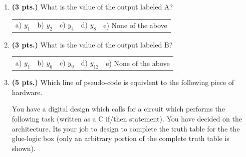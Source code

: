 \documentclass{article}
\begin{document}
\begin{enumerate}
\item {\bf (3 pts.)} What is the value of the output labeled A?

\begin{tabular}{p{0.6in} p{0.6in} p{0.6in} p{0.6in} l}
a) $y_{1}$ & b) $y_{2}$ & c) $y_{4}$ & d) $y_{8}$ & e) None of the above
\end{tabular}

\item {\bf (3 pts.)} What is the value of the output labeled B?

\begin{tabular}{p{0.6in} p{0.6in} p{0.6in} p{0.6in} l}
a) $y_{1}$ & b) $y_{6}$ & c) $y_{9}$ & d) $y_{12}$ & e) None of the above
\end{tabular}


\item {\bf (5 pts.)} Which line of pseudo-code is equivlent to 
the following piece of hardware.  



\pagebreak
You have a digital design which calls for a circuit which performs the 
following task (written as a C if/then statement).  You have decided on 
the architecture.  Its your job to design to complete the truth table
for the the glue-logic box (only an arbitrary portion of the complete 
truth table is shown).  


\end{enumerate}
\end{document}
